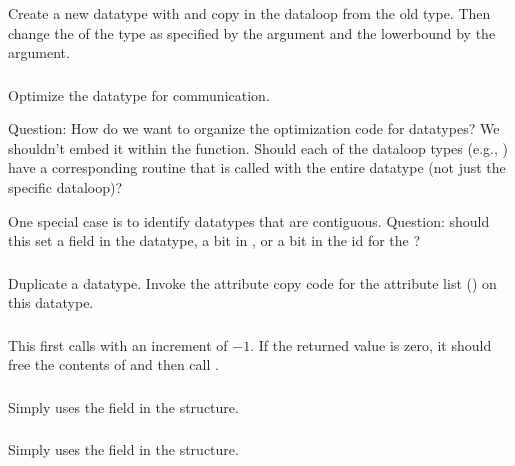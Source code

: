 \documentclass{article}
\begin{document}
\subsubsection{}
Create a new datatype with  and copy in the
dataloop from the old type.  Then change the
 of the type as specified by the
 argument and the lowerbound by the  argument. 

\subsubsection{}
Optimize the datatype for communication.  

Question:  How do we want to organize the optimization code for datatypes?  We
shouldn't embed it within the  function.  Should each of
the dataloop types (e.g., ) have a corresponding routine
that is called with the entire datatype (not just the specific dataloop)?

One special case is to identify datatypes that are contiguous.  
Question: should this set a field in the datatype, a bit in
, or a bit in the id for the
? 

\subsubsection{}
Duplicate a datatype.  Invoke the attribute copy code for the attribute list
() on this datatype.

\subsubsection{}
This first calls  with an increment of $-1$.  If
the returned value is zero, it should free the contents of  and
then call .

\subsubsection{}
Simply uses the  field in the structure.

\subsubsection{}
Simply uses the  field in the structure.
\end{document}
